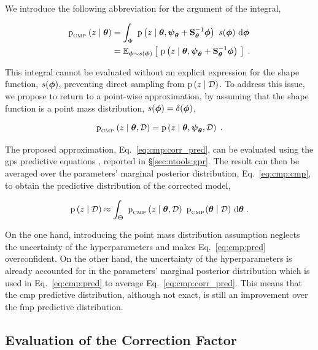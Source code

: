 We introduce the following abbreviation for the argument of the integral,

\begin{equation}
    \left.
    \begin{aligned}
        \mathrm{p}_{_{\text{CMP}}} \left( z \mid \boldsymbol{\theta} \right) &= \displaystyle\int_{\Phi} \ \mathrm{p} \left( z \mid \boldsymbol{\theta}, \boldsymbol{\psi}_{\boldsymbol{\theta}} + \mathbf{S}_{\boldsymbol{\theta}}^{-1} \boldsymbol{\phi} \right) \ s(\boldsymbol{\phi}) \ \text{d} \boldsymbol{\phi}\\
        & = \mathbb{E}_{\boldsymbol{\phi} \sim s(\boldsymbol{\phi})} \left[ \ \mathrm{p} \left( z \mid \boldsymbol{\theta}, \boldsymbol{\psi}_{\boldsymbol{\theta}} + \mathbf{S}_{\boldsymbol{\theta}}^{-1} \boldsymbol{\phi} \right) \ \right] \;.
    \end{aligned}
    \right.
\label{eq:cmp:arg_pred}
\end{equation}


This integral cannot be evaluated without an explicit expression for the shape function, $s(\boldsymbol{\phi})$, preventing direct sampling from $\mathrm{p} \left( z \mid \mathcal{D} \right)$. To address this issue, we propose to return to a point-wise approximation, by assuming that the shape function is a point mass distribution, $s(\boldsymbol{\phi}) = \delta(\boldsymbol{\phi})$,


\begin{equation}
    \mathrm{p}_{_{\text{CMP}}} \left(  z \mid \boldsymbol{\theta}, \mathcal{D} \right) = \mathrm{p} \left( z \mid \boldsymbol{\theta}, \boldsymbol{\psi}_{\boldsymbol{\theta}}, \mathcal{D} \right) \; .
    \label{eq:cmp:corr_pred}
\end{equation}

The proposed approximation, Eq.~\eqref{eq:cmp:corr_pred}, can be evaluated using the \glspl{gp} predictive equations \cite{gp_rasmussen}, reported in \S\ref{sec:ntools:gpr}. The result can then be averaged over the parameters' marginal posterior distribution, Eq.~\eqref{eq:cmp:cmp}, to obtain the predictive distribution of the corrected model, 

\begin{equation}
    \mathrm{p} \left( z \mid \mathcal{D} \right) \approx \displaystyle \int_{\Theta} \ \mathrm{p}_{_{\text{CMP}}} \left(  z \mid \boldsymbol{\theta}, \mathcal{D} \right) \ \mathrm{p}_{_{\text{CMP}}} (\boldsymbol{\theta} \mid \mathcal{D}) \ \text{d} \boldsymbol{\theta} \;.
    \label{eq:cmp:pred}
\end{equation}

On the one hand, introducing the point mass distribution assumption neglects the uncertainty of the hyperparameters and makes Eq.~\eqref{eq:cmp:pred} overconfident. On the other hand, the uncertainty of the hyperparameters is already accounted for in the parameters' marginal posterior distribution which is used in Eq.~\eqref{eq:cmp:pred} to average Eq.~\eqref{eq:cmp:corr_pred}. This means that the \gls{cmp} predictive distribution, although not exact, is still an improvement over the \gls{fmp} predictive distribution.

\subsection{Evaluation of the Correction Factor}
\label{sc:cmp:sc_fact}

